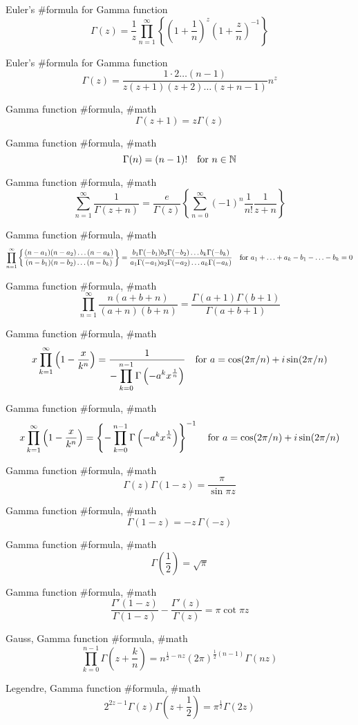 Euler’s #formula for Gamma function
$$
\Gamma(z)=\frac{1}{z}\prod^\infty_{n=1}\left\{\left(1+\frac{1}{n}\right)^z\left(1+\frac{z}{n}\right)^{-1}\right\}
$$

Euler’s #formula for Gamma function
$$
\Gamma(z)=\frac{1\cdot 2\ldots(n-1)}{z(z+1)(z+2)\ldots(z+n-1)}n^z
$$

Gamma function #formula, #math
$$
\Gamma(z+1)=z \Gamma(z)
$$

Gamma function #formula, #math
$$
\Gamma(n)=(n-1)! \quad {\rm for}\,\,n\in{\mathbb N}
$$

Gamma function #formula, #math
$$
\sum^\infty_{n=1}\frac{1}{\Gamma(z+n)}=\frac{e}{\Gamma(z)}\left\{\sum^\infty_{n=0}(-1)^n\frac{1}{n!}\frac{1}{z+n}\right\}
$$

Gamma function #formula, #math
$$
\prod^\infty_{n=1}\left\{\frac{(n-a_1)(n-a_2)\ldots(n-a_k)}{(n-b_1)(n-b_2)\ldots(n-b_k)}\right\}=\frac{b_1\Gamma(-b_1)b_2\Gamma(-b_2)\ldots b_k\Gamma(-b_k)}{a_1\Gamma(-a_1)a_2\Gamma(-a_2)\ldots a_k\Gamma(-a_k)} \quad{\rm for}\,\, a_1+\ldots+a_k-b_1-\ldots-b_k=0
$$

Gamma function #formula, #math
$$
\prod^\infty_{n=1}\frac{n(a+b+n)}{(a+n)(b+n)}=\frac{\Gamma(a+1)\Gamma(b+1)}{\Gamma(a+b+1)}
$$

Gamma function #formula, #math
$$
x\prod^\infty_{k=1}\left(1-\frac{x}{k^n}\right)=\frac{1}{\displaystyle-\prod^{n-1}_{k=0}\Gamma\left(-a^k x^{\frac{1}{n}}\right)} \quad {\rm for}\,\,a=\cos(2\pi/n)+i\sin(2\pi/n)
$$

Gamma function #formula, #math
$$
x\prod^\infty_{k=1}\left(1-\frac{x}{k^n}\right)=\left\{\displaystyle-\prod^{n-1}_{k=0}\Gamma\left(-a^k x^{\frac{1}{n}}\right)\right\}^{-1} \quad {\rm for}\,\,a=\cos(2\pi/n)+i\sin(2\pi/n)
$$

Gamma function #formula, #math
$$
\Gamma(z)\Gamma(1-z)=\frac{\pi}{\sin\pi z}
$$

Gamma function #formula, #math
$$
\Gamma(1-z)=-z\,\Gamma(-z)
$$

Gamma function #formula, #math
$$
\Gamma\left(\frac{1}{2}\right)=\sqrt{\pi}
$$

Gamma function #formula, #math
$$
\frac{\Gamma'(1-z)}{\Gamma(1-z)}-\frac{\Gamma'(z)}{\Gamma(z)}=\pi\cot\pi z
$$

Gauss, Gamma function #formula, #math
$$
\prod^{n-1}_{k=0}\Gamma\left(z+\frac{k}{n}\right)=n^{\frac{1}{2}-nz}(2\pi)^{\frac{1}{2}(n-1)}\Gamma(nz)
$$

Legendre, Gamma function #formula, #math
$$
2^{2z-1}\Gamma(z)\Gamma\left(z+\frac{1}{2}\right)=\pi^{\frac{1}{2}}\Gamma(2z)
$$

